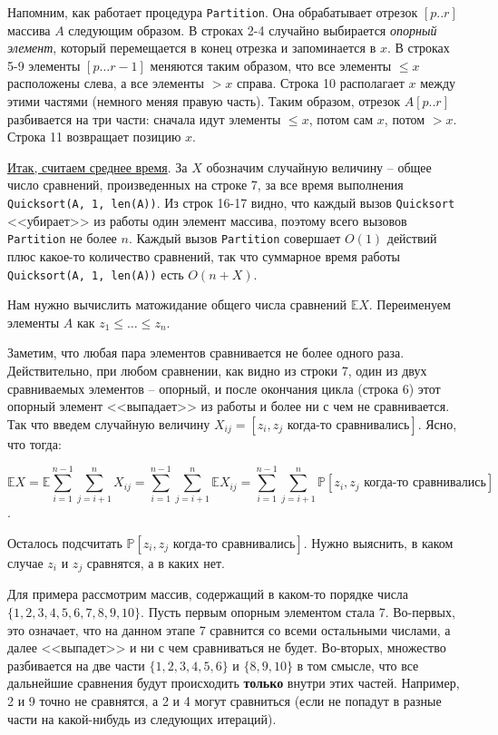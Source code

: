 Напомним, как работает процедура \texttt{Partition}. Она обрабатывает отрезок $[p..r]$ массива $A$ следующим образом.  В строках 2-4 случайно выбирается \textit{опорный элемент}, который перемещается в конец отрезка и запоминается в $x$. В строках 5-9 элементы $[p\ldots r-1]$ меняются таким образом, что все элементы $\leq x$ расположены слева, а все элементы $> x$ справа. Строка 10 располагает $x$ между этими частями (немного меняя правую часть). Таким образом, отрезок $A[p..r]$ разбивается на три части: сначала идут элементы $\leq x$, потом сам $x$, потом $>x$. Строка 11 возвращает позицию $x$.

\underline{Итак, считаем среднее время}. За $X$ обозначим случайную величину -- общее число сравнений, произведенных на строке 7, за все время выполнения \texttt{Quicksort(A, 1, len(A))}. Из строк 16-17 видно, что каждый вызов \texttt{Quicksort} <<убирает>> из работы один элемент массива, поэтому всего вызовов \texttt{Partition} не более $n$. Каждый вызов \texttt{Partition} совершает $O(1)$ действий плюс какое-то количество сравнений, так что суммарное время работы \texttt{Quicksort(A, 1, len(A))} есть $O(n+X)$.

Нам нужно вычислить матожидание общего числа сравнений $\mathbb E X$. Переименуем элементы $A$ как $z_1 \leq \ldots \leq z_n$.

Заметим, что любая пара элементов сравнивается не более одного раза. Действительно, при любом сравнении, как видно из строки 7, один из двух сравниваемых элементов -- опорный, и после окончания цикла (строка 6) этот опорный элемент <<выпадает>> из работы и более ни с чем не сравнивается. Так что введем случайную величину $X_{ij} = [z_i, z_j \text{ когда-то сравнивались}]$. Ясно, что тогда:

$$\mathbb E X = \mathbb E \sum_{i=1}^{n-1} \sum_{j=i+1}^n X_{ij} = \sum_{i=1}^{n-1} \sum_{j=i+1}^n \mathbb E X_{ij} = \sum_{i=1}^{n-1} \sum_{j=i+1}^n \mathbb P[z_i, z_j \text{ когда-то сравнивались}]$$.

Осталось подсчитать $\mathbb P[z_i, z_j\text{ когда-то сравнивались}]$. Нужно выяснить, в каком случае $z_i$ и $z_j$ сравнятся, а в каких нет.

Для примера рассмотрим массив, содержащий в каком-то порядке числа $\{1,2,3,4,5,6,7,8,9,10\}$. Пусть первым опорным элементом стала 7. Во-первых, это означает, что на данном этапе 7 сравнится со всеми остальными числами, а далее <<выпадет>> и ни с чем сравниваться не будет. Во-вторых, множество разбивается на две части $\{1,2,3,4,5,6\}$ и $\{8,9,10\}$ в том смысле, что все дальнейшие сравнения будут происходить \textbf{только} внутри этих частей. Например, 2 и 9 точно не сравнятся, а 2 и 4 могут сравниться (если не попадут в разные части на какой-нибудь из следующих итераций). 

